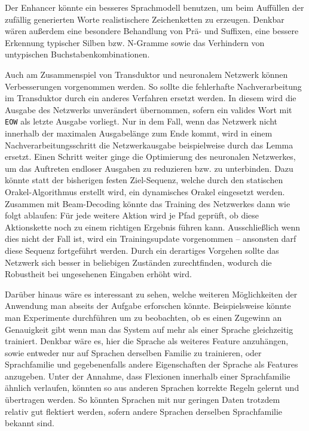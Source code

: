 \documentclass[11pt,a4paper]{article}
\newcommand{\action}[1]{\texttt{#1}}
\begin{document}
Der Enhancer könnte ein besseres Sprachmodell benutzen, um beim Auffüllen der zufällig generierten Worte realistischere Zeichenketten zu erzeugen.
Denkbar wären außerdem eine besondere Behandlung von Prä- und Suffixen, eine bessere Erkennung typischer Silben bzw. N-Gramme sowie das Verhindern von untypischen Buchstabenkombinationen.

Auch am Zusammenspiel von Transduktor und neuronalem Netzwerk können Verbesserungen vorgenommen werden.
So sollte die fehlerhafte Nachverarbeitung im Transduktor durch ein anderes Verfahren ersetzt werden.
In diesem wird die Ausgabe des Netzwerks unverändert übernommen, sofern ein valides Wort mit \action{EOW} als letzte Ausgabe vorliegt.
Nur in dem Fall, wenn das Netzwerk nicht innerhalb der maximalen Ausgabelänge zum Ende kommt, wird in einem Nachverarbeitungsschritt die Netzwerkausgabe beispielweise durch das Lemma ersetzt.
Einen Schritt weiter ginge die Optimierung des neuronalen Netzwerkes, um das Auftreten endloser Ausgaben zu reduzieren bzw. zu unterbinden.
Dazu könnte statt der bisherigen festen Ziel-Sequenz, welche durch den statischen Orakel-Algorithmus erstellt wird, ein dynamisches Orakel eingesetzt werden.
Zusammen mit Beam-Decoding könnte das Training des Netzwerkes dann wie folgt ablaufen:
Für jede weitere Aktion wird je Pfad geprüft, ob diese Aktionskette noch zu einem richtigen Ergebnis führen kann.
Ausschließlich wenn dies nicht der Fall ist, wird ein Trainingsupdate vorgenommen -- ansonsten darf diese Sequenz fortgeführt werden.
Durch ein derartiges Vorgehen sollte das Netzwerk sich besser in beliebigen Zuständen zurechtfinden, wodurch die Robustheit bei ungesehenen Eingaben erhöht wird.



Darüber hinaus wäre es interessant zu sehen, welche weiteren Möglichkeiten der Anwendung man abseits der Aufgabe erforschen könnte. Beispielsweise könnte man Experimente durchführen um zu beobachten, ob es einen Zugewinn an Genauigkeit gibt wenn man das System auf mehr als einer Sprache gleichzeitig trainiert. Denkbar wäre es, hier die Sprache als weiteres Feature anzuhängen, sowie entweder nur auf Sprachen derselben Familie zu trainieren, oder Sprachfamilie und gegebenenfalls andere Eigenschaften der Sprache als Features anzugeben. Unter der Annahme, dass Flexionen innerhalb einer Sprachfamilie ähnlich verlaufen, könnten so aus anderen Sprachen korrekte Regeln gelernt und übertragen werden. So könnten Sprachen mit nur geringen Daten trotzdem relativ gut flektiert werden, sofern andere Sprachen derselben Sprachfamilie bekannt sind.
\end{document}
